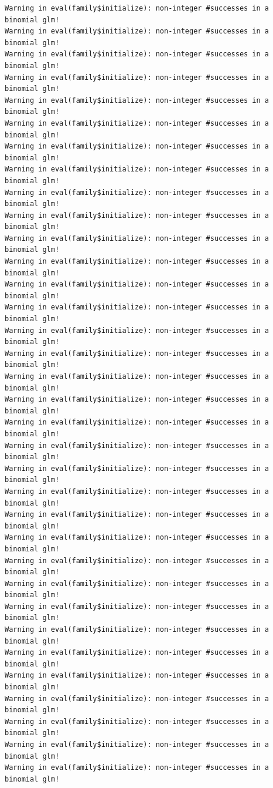 \documentclass[
  letterpaper,
  DIV=11,
  numbers=noendperiod]{scrartcl}
\begin{document}
\begin{verbatim}
Warning in eval(family$initialize): non-integer #successes in a binomial glm!
Warning in eval(family$initialize): non-integer #successes in a binomial glm!
Warning in eval(family$initialize): non-integer #successes in a binomial glm!
Warning in eval(family$initialize): non-integer #successes in a binomial glm!
Warning in eval(family$initialize): non-integer #successes in a binomial glm!
Warning in eval(family$initialize): non-integer #successes in a binomial glm!
Warning in eval(family$initialize): non-integer #successes in a binomial glm!
Warning in eval(family$initialize): non-integer #successes in a binomial glm!
Warning in eval(family$initialize): non-integer #successes in a binomial glm!
Warning in eval(family$initialize): non-integer #successes in a binomial glm!
Warning in eval(family$initialize): non-integer #successes in a binomial glm!
Warning in eval(family$initialize): non-integer #successes in a binomial glm!
Warning in eval(family$initialize): non-integer #successes in a binomial glm!
Warning in eval(family$initialize): non-integer #successes in a binomial glm!
Warning in eval(family$initialize): non-integer #successes in a binomial glm!
Warning in eval(family$initialize): non-integer #successes in a binomial glm!
Warning in eval(family$initialize): non-integer #successes in a binomial glm!
Warning in eval(family$initialize): non-integer #successes in a binomial glm!
Warning in eval(family$initialize): non-integer #successes in a binomial glm!
Warning in eval(family$initialize): non-integer #successes in a binomial glm!
Warning in eval(family$initialize): non-integer #successes in a binomial glm!
Warning in eval(family$initialize): non-integer #successes in a binomial glm!
Warning in eval(family$initialize): non-integer #successes in a binomial glm!
Warning in eval(family$initialize): non-integer #successes in a binomial glm!
Warning in eval(family$initialize): non-integer #successes in a binomial glm!
Warning in eval(family$initialize): non-integer #successes in a binomial glm!
Warning in eval(family$initialize): non-integer #successes in a binomial glm!
Warning in eval(family$initialize): non-integer #successes in a binomial glm!
Warning in eval(family$initialize): non-integer #successes in a binomial glm!
Warning in eval(family$initialize): non-integer #successes in a binomial glm!
Warning in eval(family$initialize): non-integer #successes in a binomial glm!
Warning in eval(family$initialize): non-integer #successes in a binomial glm!
Warning in eval(family$initialize): non-integer #successes in a binomial glm!
Warning in eval(family$initialize): non-integer #successes in a binomial glm!

\end{verbatim}
\end{document}
